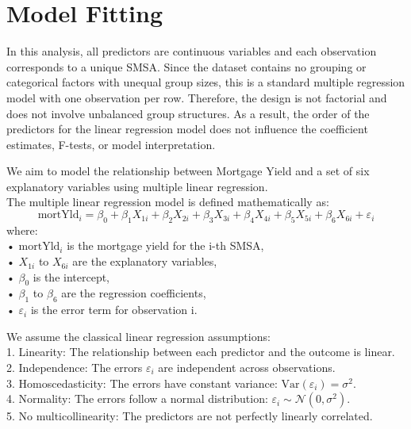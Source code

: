 \documentclass[
  12pt,
]{article}
\begin{document}
\section{Model Fitting}\label{model-fitting}

In this analysis, all predictors are continuous variables and each
observation corresponds to a unique SMSA. Since the dataset contains no
grouping or categorical factors with unequal group sizes, this is a
standard multiple regression model with one observation per row.
Therefore, the design is not factorial and does not involve unbalanced
group structures. As a result, the order of the predictors for the
linear regression model does not influence the coefficient estimates,
F-tests, or model interpretation.

We aim to model the relationship between Mortgage Yield and a set of six
explanatory variables using multiple linear regression.\\
The multiple linear regression model is defined mathematically as:
\vspace{-0.2cm} \[
\text{mortYld}_i = \beta_0 + \beta_1 X_{1i} + \beta_2 X_{2i} + \beta_3 X_{3i} + \beta_4 X_{4i} + \beta_5 X_{5i} + \beta_6 X_{6i} + \varepsilon_i
\] where:\\
• \(\text{mortYld}_i\) is the mortgage yield for the i-th SMSA,\\
• \(X_{1i}\) to \(X_{6i}\) are the explanatory variables,\\
• \(\beta_0\) is the intercept,\\
• \(\beta_1\) to \(\beta_6\) are the regression coefficients,\\
• \(\varepsilon_i\) is the error term for observation i.

\vspace{0.2cm}

We assume the classical linear regression assumptions:\\
1. Linearity: The relationship between each predictor and the outcome is
linear.\\
2. Independence: The errors \(\varepsilon_i\) are independent across
observations.\\
3. Homoscedasticity: The errors have constant variance:
\(\text{Var}(\varepsilon_i) = \sigma^2\).\\
4. Normality: The errors follow a normal distribution:
\(\varepsilon_i \sim \mathcal{N}(0, \sigma^2)\).\\
5. No multicollinearity: The predictors are not perfectly linearly
correlated.
\end{document}
